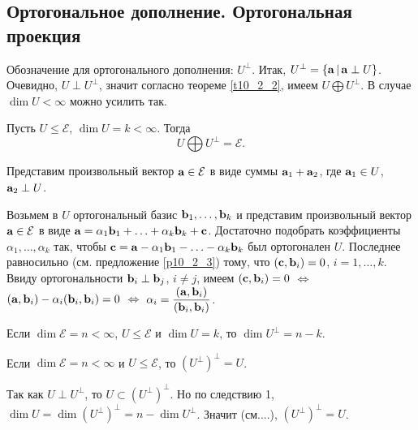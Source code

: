 \subsection{Ортогональное дополнение. Ортогональная проекция}


 Обозначение для ортогонального дополнения: $U^{\bot}$. Итак,  $U^{\bot} = \{\mathbf{a} \, | \, \mathbf{a}\perp U\}$.
Очевидно, $U\perp U^{\bot}$, значит согласно теореме \ref{t10_2_2}, имеем  $U\bigoplus U^{\bot}$.
В случае $\dim U<\infty$ можно усилить так.

\begin{theor}\label{t10_2_3} 
Пусть $U\leq \mathcal{E}$, $\dim U=k<\infty$.
Тогда $$\boxed{U\bigoplus U^{\bot}=\mathcal{E}}.$$
\end{theor}
\dok 
Представим произвольный вектор $\mathbf{a}\in \mathcal{E}$ в виде суммы $\mathbf{a}_1+\mathbf{a}_2$, где $\mathbf{a}_1\in U$,  $\mathbf{a}_2\perp U$.

Возьмем в $U$ ортогональный базис $\mathbf{b}_1, \ldots, \mathbf{b}_k$ 
и представим произвольный вектор $\mathbf{a}\in \mathcal{E}$ 
в виде $\mathbf{a} = \alpha_1\mathbf{b}_1+\ldots + \alpha_k\mathbf{b}_k +\mathbf{c}$. Достаточно подобрать коэффициенты $\alpha_1, \ldots, \alpha_k$ так, чтобы
$\mathbf{c}=  \mathbf{a} - \alpha_1\mathbf{b}_1 - \ldots - \alpha_k\mathbf{b}_k$ был ортогонален $U$. Последнее равносильно (см. предложение \ref{p10_2_3})
тому, что $(\mathbf{c}, \mathbf{b}_i)=0$, $i=1, \ldots, k$. 
Ввиду ортогональности $\mathbf{b}_i\perp \mathbf{b}_j$, $i\neq j$, имеем $(\mathbf{c}, \mathbf{b}_i)=0$
$\Leftrightarrow$  $(\mathbf{a}, \mathbf{b}_i)-\alpha_i (\mathbf{b}_i, \mathbf{b}_i)=0$ $\Leftrightarrow$ $\alpha_i = \dfrac{(\mathbf{a}, \mathbf{b}_i)}{(\mathbf{b}_i, \mathbf{b}_i)}$.
\edok

\begin{sled1}
Если  $\dim \mathcal{E}=n< \infty$,  $U\leq \mathcal{E}$ и $\dim U =k$, то $\dim U^{\bot} = n-k$.
\end{sled1}

\begin{sled2}
Если  $\dim \mathcal{E}=n<\infty$ и $U\leq \mathcal{E}$, то $(U^{\bot})^{\bot} = U$.
\end{sled2}
\dok 
Так как $U\perp U^{\bot}$, то $U \subset (U^{\bot})^{\bot}$. Но по следствию 1, $\dim U =\dim  (U^{\bot})^{\bot} = n-\dim U^{\bot}$.
Значит (см....), $(U^{\bot})^{\bot} = U$.
\edok

